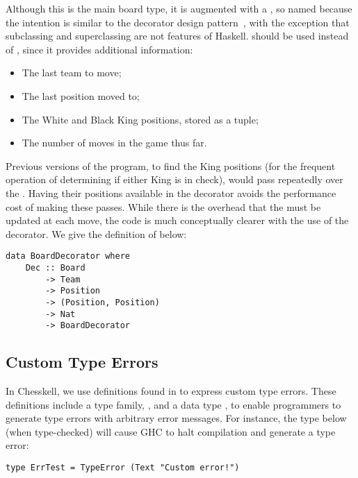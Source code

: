 Although this is the main board type, it is augmented with a , so named because the intention is similar to the decorator design pattern~\cite{decorator}, with the exception that subclassing and superclassing are not features of Haskell.  should be used instead of , since it provides additional information:

\begin{itemize}
    \item The last team to move;
    \item The last position moved to;
    \item The White and Black King positions, stored as a tuple;
    \item The number of moves in the game thus far.
\end{itemize}

Previous versions of the program, to find the King positions (for the frequent operation of determining if either King is in check), would pass repeatedly over the . Having their positions available in the decorator avoids the performance cost of making these passes. While there is the overhead that the  must be updated at each move, the code is much conceptually clearer with the use of the decorator. We give the definition of  below:

\begin{lstlisting}
data BoardDecorator where
    Dec :: Board
        -> Team
        -> Position
        -> (Position, Position)
        -> Nat
        -> BoardDecorator
\end{lstlisting}

\subsection{Custom Type Errors}

In Chesskell, we use definitions found in  to express custom type errors. These definitions include a type family, , and a data type , to enable programmers to generate type errors with arbitrary error messages. For instance, the type below (when type-checked) will cause GHC to halt compilation and generate a type error:

\begin{lstlisting}
type ErrTest = TypeError (Text "Custom error!")
\end{lstlisting}


